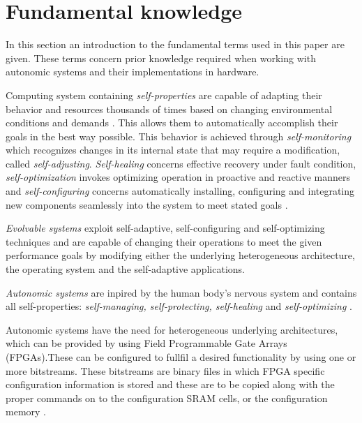 
\section{Fundamental knowledge}
\label{sec:fundamental}

In this section an introduction to the fundamental terms used in this paper are given. These terms concern prior knowledge required when working with autonomic systems and their implementations in hardware. 

Computing system containing \emph{self-properties} are capable of adapting their behavior and resources thousands of times based on changing environmental conditions and demands \cite{selfaware}. This allows them to automatically accomplish their goals in the best way possible. This behavior is achieved through \emph{self-monitoring} which recognizes changes in its internal state that may require a modification, called \emph{self-adjusting}. \emph{Self-healing} concerns effective recovery under fault condition, \emph{self-optimization} invokes optimizing operation in proactive and reactive manners and \emph{self-configuring} concerns automatically installing, configuring and integrating new components seamlessly into the system to meet stated goals \cite{autocom}. 

\emph{Evolvable systems} exploit self-adaptive, self-configuring and self-optimizing techniques and are capable of changing their operations to meet the given performance goals by modifying either the underlying heterogeneous architecture, the operating system and the self-adaptive applications. \cite{evolvable}

\emph{Autonomic systems} are inpired by the human body's nervous system and contains all self-properties: \emph{self-managing, self-protecting, self-healing} and \emph{self-optimizing} \cite{autonomic}. 

Autonomic systems have the need for heterogeneous underlying architectures, which can be provided by using Field Programmable Gate Arrays (FPGAs).These can be configured to fullfil a desired functionality by using one or more bitstreams. These bitstreams are binary files in which FPGA specific configuration information is stored and these are to be copied along with the proper commands on to the configuration SRAM cells, or the configuration memory \cite{reconfigurable}. 